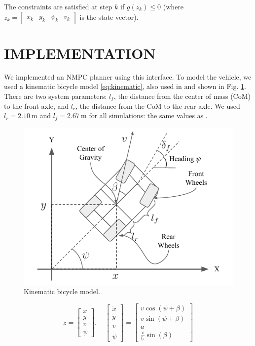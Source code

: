 \documentclass[letterpaper, 10 pt, conference]{ieeeconf}  %
\begin{document}
The constraints are satisfied at step $k$ if $g(z_k) \leq 0$ (where $z_k = \begin{bmatrix}
x_k& y_k& \psi_k& v_k
\end{bmatrix}$ is the state vector).



 \section{IMPLEMENTATION}
 
We implemented an NMPC planner using this interface. To model the vehicle, we used a kinematic bicycle model \eqref{eq:kinematic}, also used in \cite{farag} and shown in Fig. \ref{fig:kinematic}. There are two system parameters: $l_f$, the distance from the center of mass (CoM) to the front axle, and $l_r$, the distance from the CoM to the rear axle. We used $l_r = 2.10\ \text{m}$ and $l_f = 2.67\ \text{m}$ for all simulations: the same values as \cite{farag}.
 
 \begin{figure}[htbp]
 	\centering
 	\includegraphics[width=0.8\linewidth]{figures/kinematic_diagram.pdf}
 	\caption{Kinematic bicycle model.}
 	\label{fig:kinematic}
 \end{figure}
 \vspace{-1em}

 \begin{equation}
 z = \begin{bmatrix}
 x\\y\\v\\\psi
 \end{bmatrix},\quad \begin{bmatrix}
 \dot x\\\dot y\\\dot v\\\dot\psi
 \end{bmatrix} = \begin{bmatrix}
 v\cos(\psi + \beta)\\
 v\sin(\psi + \beta)\\
 a\\
 \frac{v}{l_r}\sin(\beta)
 \end{bmatrix}
 \label{eq:kinematic}
 \end{equation}
 
\end{document}
